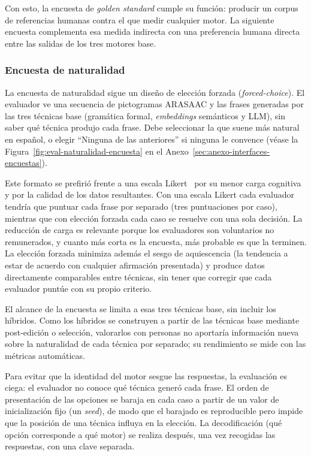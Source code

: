 Con esto, la encuesta de \textit{golden standard} cumple su función: producir un corpus de referencias humanas contra el que medir cualquier motor. La siguiente encuesta complementa esa medida indirecta con una preferencia humana directa entre las salidas de los tres motores base.

\subsubsection{Encuesta de naturalidad}
\label{sec:eval-naturalidad-diseno}

La encuesta de naturalidad sigue un diseño de elección forzada (\textit{forced-choice}). El evaluador ve una secuencia de pictogramas ARASAAC y las frases generadas por las tres técnicas base (gramática formal, \textit{embeddings} semánticos y LLM), sin saber qué técnica produjo cada frase. Debe seleccionar la que suene más natural en español, o elegir ``Ninguna de las anteriores'' si ninguna le convence (véase la Figura~\ref{fig:eval-naturalidad-encuesta} en el Anexo~\ref{sec:anexo-interfaces-encuestas}).

Este formato se prefirió frente a una escala Likert~\cite{likert1932} por su menor carga cognitiva y por la calidad de los datos resultantes. Con una escala Likert cada evaluador tendría que puntuar cada frase por separado (tres puntuaciones por caso), mientras que con elección forzada cada caso se resuelve con una sola decisión. La reducción de carga es relevante porque los evaluadores son voluntarios no remunerados, y cuanto más corta es la encuesta, más probable es que la terminen. La elección forzada minimiza además el sesgo de aquiescencia (la tendencia a estar de acuerdo con cualquier afirmación presentada) y produce datos directamente comparables entre técnicas, sin tener que corregir que cada evaluador puntúe con su propio criterio.

El alcance de la encuesta se limita a esas tres técnicas base, sin incluir los híbridos. Como los híbridos se construyen a partir de las técnicas base mediante post-edición o selección, valorarlos con personas no aportaría información nueva sobre la naturalidad de cada técnica por separado; su rendimiento se mide con las métricas automáticas.

Para evitar que la identidad del motor sesgue las respuestas, la evaluación es ciega: el evaluador no conoce qué técnica generó cada frase. El orden de presentación de las opciones se baraja en cada caso a partir de un valor de inicialización fijo (un \textit{seed}), de modo que el barajado es reproducible pero impide que la posición de una técnica influya en la elección. La decodificación (qué opción corresponde a qué motor) se realiza después, una vez recogidas las respuestas, con una clave separada.


